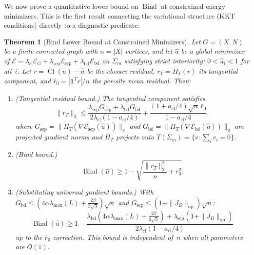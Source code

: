 \documentclass[lettersize,journal]{IEEEtran}
\newtheorem{theorem}{Theorem}
\DeclareMathOperator{\Cl}{Cl}
\DeclareMathOperator{\Bind}{Bind}
\begin{document}
We now prove a quantitative lower bound on $\Bind$ at constrained energy minimizers. This is the first result connecting the variational structure (KKT conditions) directly to a diagnostic predicate.

\begin{theorem}[Bind Lower Bound at Constrained Minimizers]
\label{thm:bind-bound}
Let $G = (X, N)$ be a finite connected graph with $n = |X|$ vertices, and let $\hat{u}$ be a global minimizer of $\mathcal{E} = \lambda_{\mathrm{cl}}\mathcal{E}_{\mathrm{cl}} + \lambda_{\mathrm{sep}}\mathcal{E}_{\mathrm{sep}} + \lambda_{\mathrm{bd}}\mathcal{E}_{\mathrm{bd}}$ on $\Sigma_m$ satisfying strict interiority: $0 < \hat{u}_i < 1$ for all~$i$. Let $r = \Cl(\hat{u}) - \hat{u}$ be the closure residual, $r_T = \Pi_T(r)$ its tangential component, and $\bar{r}_0 = |\mathbf{1}^T r|/n$ the per-site mean residual. Then:
\begin{enumerate}
\item[\textbf{(a)}] \emph{(Tangential residual bound.)} The tangential component satisfies
\begin{equation}
\label{eq:bind-tangential}
\|r_T\|_2 \leq \frac{\lambda_{\mathrm{sep}} G_{\mathrm{sep}} + \lambda_{\mathrm{bd}} G_{\mathrm{bd}}}{2\lambda_{\mathrm{cl}}(1 - a_{\mathrm{cl}}/4)} + \frac{(1 + a_{\mathrm{cl}}/4)\sqrt{n}\,\bar{r}_0}{1 - a_{\mathrm{cl}}/4},
\end{equation}
where $G_{\mathrm{sep}} = \|\Pi_T(\nabla\mathcal{E}_{\mathrm{sep}}(\hat{u}))\|_2$ and $G_{\mathrm{bd}} = \|\Pi_T(\nabla\mathcal{E}_{\mathrm{bd}}(\hat{u}))\|_2$ are projected gradient norms and $\Pi_T$ projects onto $T(\Sigma_m) = \{v : \sum_i v_i = 0\}$.

\item[\textbf{(b)}] \emph{(Bind bound.)}
\begin{equation}
\label{eq:bind-full}
\Bind(\hat{u}) \geq 1 - \sqrt{\frac{\|r_T\|_2^2}{n} + \bar{r}_0^2}.
\end{equation}

\item[\textbf{(c)}] \emph{(Substituting universal gradient bounds.)} With $G_{\mathrm{bd}} \leq (4\alpha\lambda_{\max}(L) + \frac{2\beta}{3\sqrt{3}})\sqrt{n}$ and $G_{\mathrm{sep}} \leq (1 + \|J_D\|_{\mathrm{op}})\sqrt{n}$:
\begin{equation}
\label{eq:bind-explicit}
\Bind(\hat{u}) \geq 1 - \frac{\lambda_{\mathrm{bd}}(4\alpha\lambda_{\max}(L) + \frac{2\beta}{3\sqrt{3}}) + \lambda_{\mathrm{sep}}(1 + \|J_D\|_{\mathrm{op}})}{2\lambda_{\mathrm{cl}}(1 - a_{\mathrm{cl}}/4)}
\end{equation}
up to the $\bar{r}_0$ correction. This bound is independent of~$n$ when all parameters are $O(1)$.
\end{enumerate}
\end{theorem}
\end{document}
